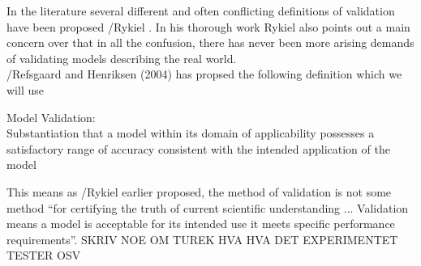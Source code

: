 In the literature several different and often conflicting definitions of validation have been proposed /Rykiel . In his thorough work Rykiel also points out a main concern over that in all the confusion, there has never been more arising demands of validating models describing the real world. \\

/Refsgaard and Henriksen (2004) has propsed the following definition which we will use  

\begin{defn} 
Model Validation: \\Substantiation that a model within its domain of applicability possesses a satisfactory range of accuracy consistent with the intended application of the model
\end{defn}

This means as /Rykiel earlier proposed, the method of validation is not some method ``for certifying the truth of current scientific understanding ... Validation means a model is acceptable for its intended use it meets specific performance requirements''.  SKRIV NOE OM TUREK HVA HVA DET EXPERIMENTET TESTER OSV

 


